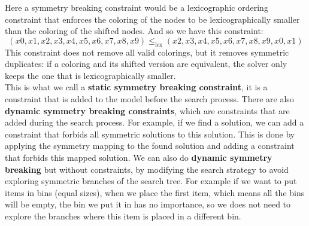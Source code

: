 \documentclass[12pt, openany]{report}
\theoremstyle{definition}
\begin{document}
Here a symmetry breaking constraint would be a lexicographic ordering constraint that enforces the coloring of the nodes to be lexicographically smaller than the coloring of the shifted nodes. And so we have this constraint:
\begin{equation}
    (x0, x1, x2, x3, x4, x5, x6, x7, x8, x9) \leq_{\text{lex}} (x2, x3, x4, x5, x6, x7, x8, x9, x0, x1)
\end{equation}
This constraint does not remove all valid colorings, but it removes symmetric duplicates: if a coloring and its shifted version are equivalent, the solver only keeps the one that is lexicographically smaller.\\
This is what we call a \textbf{static symmetry breaking constraint}, it is a constraint that is added to the model before the search process. There are also \textbf{dynamic symmetry breaking constraints}, which are constraints that are added during the search process. For example, if we find a solution, we can add a constraint that forbids all symmetric solutions to this solution. This is done by applying the symmetry mapping to the found solution and adding a constraint that forbids this mapped solution. We can also do \textbf{dynamic symmetry breaking} but without constraints, by modifying the search strategy to avoid exploring symmetric branches of the search tree. For example if we want to put items in bins (equal sizes), when we place the first item, which means all the bins will be empty, the bin we put it in has no importance, so we does not need to explore the branches where this item is placed in a different bin.\\
\end{document}
